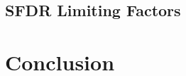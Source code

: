 \documentclass[lettersize,journal]{IEEEtran}
\begin{document}
\subsection{SFDR Limiting Factors}


\section{Conclusion}
\label{sec:conc}


\end{document}
